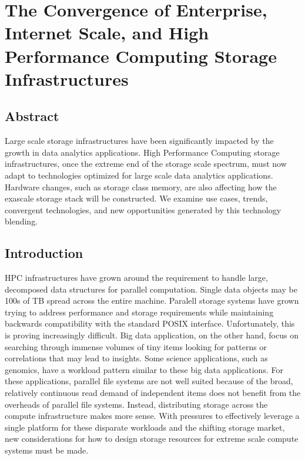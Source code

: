 

\chapter{The Convergence of Enterprise, Internet Scale, and High Performance Computing Storage Infrastructures}

\section*{Abstract}
Large scale storage infrastructures have been significantly impacted by the
growth in data analytics applications. High Performance Computing storage
infrastructures, once the extreme end of the storage scale spectrum, must now
adapt to technologies optimized for large scale data analytics applications.
Hardware changes, such as storage class memory, are also affecting how
the exascale storage stack will be constructed. We examine use cases, trends,
convergent technologies, and new opportunities generated by this technology
blending.

\section{Introduction}\label{sec:intro}
HPC infrastructures have grown around the requirement to handle large,
decomposed data structures for parallel computation. Single data objects may be
100s of TB spread across the entire machine. Paralell storage systems have
grown trying to address performance and storage requirements while maintaining
backwards compatibility with the standard POSIX interface.  Unfortunately, this
is proving increasingly difficult. Big data application, on the other hand,
focus on searching through immense volumes of tiny items looking for patterns
or correlations that may lead to insights.  Some science applications, such as
genomics, have a workload pattern similar to these big data applications. For
these applications, parallel file systems are not well suited because of the
broad, relatively continuous read demand of independent items does not benefit
from the overheads of parallel file systems. Instead, distributing storage
across the compute infrastructure makes more sense. With pressures to
effectively leverage a single platform for these disparate workloads and the
shifting storage market, new considerations for how to design storage resources
for extreme scale compute systems must be made.

